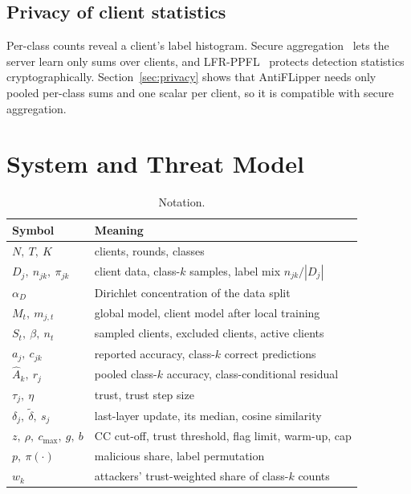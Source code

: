 \documentclass[journal]{IEEEtran}
\begin{document}
\subsection{Privacy of client statistics}
Per-class counts reveal a client's label histogram. Secure aggregation~\cite{bonawitz2017practical} lets the server learn only sums over clients, and LFR-PPFL~\cite{shen2024lfrppfl} protects detection statistics cryptographically. Section~\ref{sec:privacy} shows that AntiFLipper needs only pooled per-class sums and one scalar per client, so it is compatible with secure aggregation.

\section{System and Threat Model}
\label{sec:model}
\begin{table}[t]
\centering
\caption{Notation.}
\label{tab:notation}
\footnotesize
\setlength{\tabcolsep}{4pt}
\begin{tabular}{@{}ll@{}}
\toprule
\textbf{Symbol} & \textbf{Meaning} \\
\midrule
$N,\ T,\ K$ & clients, rounds, classes \\
$D_j,\ n_{jk},\ \pi_{jk}$ & client data, class-$k$ samples, label mix $n_{jk}/|D_j|$ \\
$\alpha_D$ & Dirichlet concentration of the data split \\
$M_t,\ m_{j,t}$ & global model, client model after local training \\
$S_t,\ \beta,\ n_t$ & sampled clients, excluded clients, active clients \\
$a_j,\ c_{jk}$ & reported accuracy, class-$k$ correct predictions \\
$\hat A_k,\ r_j$ & pooled class-$k$ accuracy, class-conditional residual \\
$\tau_j,\ \eta$ & trust, trust step size \\
$\delta_j,\ \tilde\delta,\ s_j$ & last-layer update, its median, cosine similarity \\
$z,\ \rho,\ c_{\max},\ g,\ b$ & CC cut-off, trust threshold, flag limit, warm-up, cap \\
$p,\ \pi(\cdot)$ & malicious share, label permutation \\
$w_k$ & attackers' trust-weighted share of class-$k$ counts \\
\bottomrule
\end{tabular}
\end{table}
\end{document}
